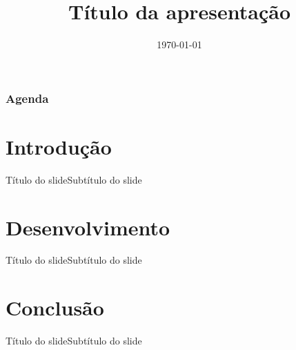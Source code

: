 \documentclass[xcolor=dvipsnames, aspectratio=169]{beamer}
\title[Título curto]{Título da apresentação}
\date{\today}
\begin{document}
\frame{\titlepage}

\begin{frame}
    \frametitle{Agenda}
    \tableofcontents
\end{frame}

\section{Introdução}

\begin{frame}{Título do slide}{Subtítulo do slide}
\lipsum[1]
\end{frame}

\section{Desenvolvimento}

\begin{frame}{Título do slide}{Subtítulo do slide}
\lipsum[1]
\end{frame}

\section{Conclusão}

\begin{frame}{Título do slide}{Subtítulo do slide}
\lipsum[1]
\end{frame}
\end{document}
